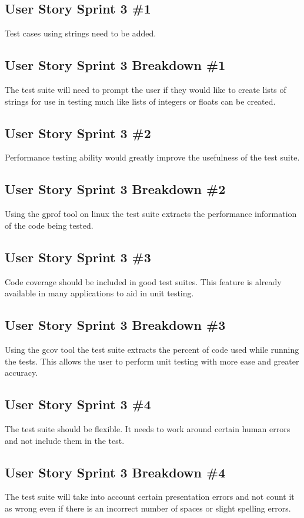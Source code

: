 \subsection{User Story Sprint 3 \#1}
Test cases using strings need to be added.

\subsection{User Story Sprint 3 Breakdown \#1}
The test suite will need to prompt the user if they would like to create lists of strings for use in testing much like lists of integers or floats can be created.

\subsection{User Story Sprint 3 \#2}
Performance testing ability would greatly improve the usefulness of the test suite.

\subsection{User Story Sprint 3 Breakdown \#2}
Using the gprof tool on linux the test suite extracts the performance information of the  code being tested.

\subsection{User Story Sprint 3 \#3}
Code coverage should be included in good test suites. This feature is already available in many applications to aid in unit testing.

\subsection{User Story Sprint 3 Breakdown \#3}
Using the gcov tool the test suite extracts the percent of code used while running the tests. This allows the user to perform unit testing with more ease and greater accuracy.

\subsection{User Story Sprint 3 \#4}
The test suite should be flexible. It needs to work around certain human errors and not include them in the test.

\subsection{User Story Sprint 3 Breakdown \#4}
The test suite will take into account certain presentation errors and not count it as wrong even if there is an incorrect number of spaces or slight spelling errors.

